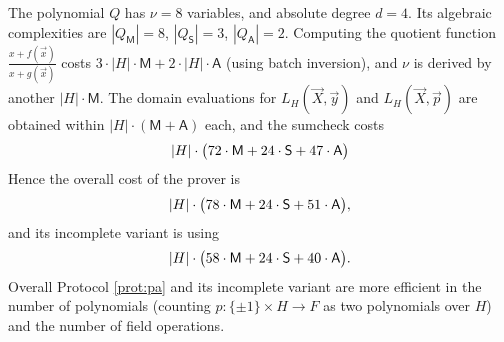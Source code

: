 \documentclass[11pt]{article}
\theoremstyle{definition}
\theoremstyle{remark}
\begin{document}
The polynomial $Q$ has $\nu = 8$ variables, and absolute degree $d = 4$.
Its algebraic complexities are $|Q_\mathsf M|= 8$, $|Q_\mathsf S|= 3$, $|Q_\mathsf A|= 2$.
Computing the quotient function $\frac{x + f(\vec x)}{x+ g(\vec x)}$ costs $3\cdot |H|\cdot\mathsf M + 2\cdot |H|\cdot\mathsf A$ (using batch inversion), and $\nu$ is derived by another $|H|\cdot\mathsf M$.
The domain evaluations for $L_H(\vec X, \vec y)$ and $L_H(\vec X, \vec p)$ are obtained within $|H|\cdot (\mathsf M + \mathsf A)$ each, and the sumcheck costs 
\begin{equation*}
|H| \cdot \big(72 \cdot\textsf M +  24 \cdot\textsf S + 47 \cdot \textsf A\big) 
\end{equation*}
Hence the overall cost of the prover is
\begin{equation}
|H| \cdot \big(78 \cdot\textsf M +  24\cdot\textsf S +  51 \cdot \textsf A\big),
\end{equation}
and its incomplete variant is using
\begin{equation}
|H| \cdot \big(58 \cdot\textsf M +  24\cdot\textsf S + 40 \cdot \textsf A\big).
\end{equation}
Overall Protocol \ref{prot:pa} and its incomplete variant are more efficient in the number of polynomials (counting $p:\{\pm 1\}\times H\rightarrow F$ as two polynomials over $H$) and the number of field operations.
\end{document}
